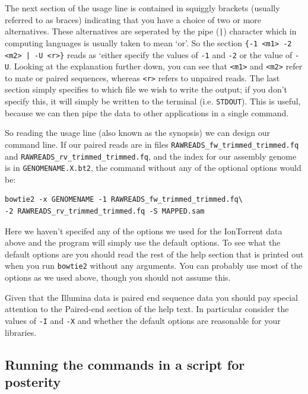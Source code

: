 \documentclass[11pt]{article}
\begin{document}
The next section of the usage line is contained in squiggly brackets (usually
referred to as braces) indicating that you have a choice of two or more
alternatives. These alternatives are seperated by the pipe (\texttt{|}) character
which in computing languages is usually taken to mean `or'. So the section 
\texttt{\{-1 <m1> -2 <m2> | -U <r>\}} reads as `either specify the values of \texttt{-1} and
\texttt{-2} or the value of \texttt{-U}. Looking at the explanation further down, you can
see that \texttt{<m1>} and \texttt{<m2>} refer to mate or paired sequences, whereas \texttt{<r>}
refers to unpaired reads. The last section simply specifies to which file we
wish to write the output; if you don't specify this, it will simply be
written to the terminal (i.e. \texttt{STDOUT}). This is useful, because we can then
pipe the data to other applications in a single command.

So reading the usage line (also known as the synopsis) we can design our
command line. If our paired reads are in files
\texttt{RAWREADS\_fw\_trimmed\_trimmed.fq} and 
\texttt{RAWREADS\_rv\_trimmed\_trimmed.fq}, and the index for our assembly genome is in 
\texttt{GENOMENAME.X.bt2}, the command without any of the optional options would be:


\begin{verbatim}
bowtie2 -x GENOMENAME -1 RAWREADS_fw_trimmed_trimmed.fq\
-2 RAWREADS_rv_trimmed_trimmed.fq -S MAPPED.sam
\end{verbatim}

Here we haven't specifed any of the options we used for the IonTorrent data
above and the program will simply use the default options. To see what the
default options are you should read the rest of the help section that is
printed out when you run \texttt{bowtie2} without any arguments. You can probably
use most of the options as we used above, though you should not assume this.

Given that the Illumina data is paired end sequence data you should pay
special attention to the Paired-end section of the help text. In particular
consider the values of \texttt{-I} and \texttt{-X} and whether the default options are
reasonable for your libraries.
\subsection{Running the commands in a script for posterity}
\label{sec-1-2}
\end{document}
